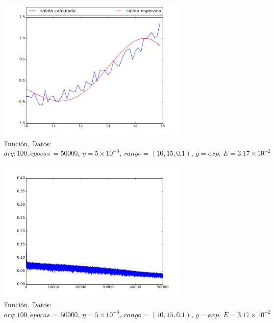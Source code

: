 \documentclass[12pt,a4paper]{article}
\begin{document}
\begin{figure}[H]
\centering
\includegraphics[width=0.85\textwidth]{img/_100_-eta_0_005-exp-FUNCTION.png}
\caption{\label{fig:test10-15-exp-fn-100} Función. Datos:  $arq: 100, \acute{e} pocas \ = 50000, \ \eta = 5 \times 10^{-3},\ rango=(10, 15, 0.1),\ g=exp, \ E = 3.17 \times 10^{-2}$}
\end{figure}


\begin{figure}[H]
\centering
\includegraphics[width=0.85\textwidth]{img/_100_-eta_0_005-exp-ERROR.png}
\caption{\label{fig:test10-15-exp-error-100} Función. Datos:  $arq: 100, \acute{e} pocas \ = 50000, \ \eta = 5 \times 10^{-3},\ rango=(10, 15, 0.1),\ g=exp, \ E = 3.17 \times 10^{-2}$}
\end{figure}
\end{document}
